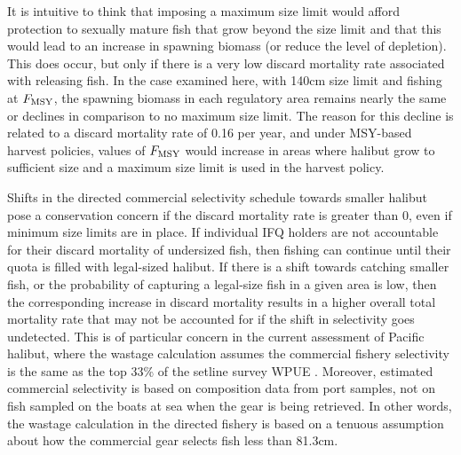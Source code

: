 It is intuitive to think that imposing a maximum size limit would afford protection to sexually mature fish that grow beyond the size limit and that this would lead to an increase in spawning biomass (or reduce the level of depletion).  This does occur, but only if there is a very low discard mortality rate associated with releasing fish.  In the case examined here, with 140cm size limit and fishing at $F_{\rm{MSY}}$, the spawning biomass in each regulatory area remains nearly the same or  declines in comparison to no maximum size limit.  The reason for this decline is related to a discard mortality rate of 0.16 per year, and under MSY-based harvest policies, values of $F_{\rm{MSY}}$ would increase in areas where halibut grow to sufficient size and a maximum size limit is used in the harvest policy.

Shifts in the directed commercial selectivity schedule towards smaller halibut pose a conservation concern if the discard mortality rate is greater than 0, even if minimum size limits are in place. If individual IFQ holders are not accountable for their discard mortality of undersized fish, then fishing can continue until their quota is filled with legal-sized halibut.  If there is a shift towards catching smaller fish, or the probability of capturing a legal-size fish in a given area is low, then the corresponding increase in discard mortality  results in a higher overall total mortality rate that may not be accounted for if the shift in selectivity goes undetected.  This is of particular concern in the current assessment of Pacific halibut, where the wastage calculation assumes the commercial fishery selectivity is the same as the top 33\% of the setline survey WPUE \citep{gilroy2009wastage}.  Moreover, estimated commercial selectivity is based on composition data from port samples, not on fish sampled on the boats at sea when the gear is being retrieved. In other words, the wastage calculation in the directed fishery is based on a tenuous assumption about how the commercial gear selects fish less than 81.3cm.

